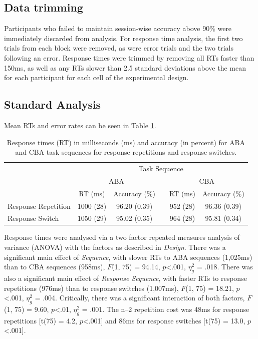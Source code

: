 \documentclass[a4paper, jou, natbib]{apa6}
\begin{document}
\subsection{Data trimming}
Participants who failed to maintain session-wise accuracy above 90\% were immediately discarded from analysis. For response time analysis, the first two trials from each block were removed, as were error trials and the two trials following an error. Response times were trimmed by removing all RTs faster than 150ms, as well as any RTs slower than 2.5 standard deviations above the mean for each participant for each cell of the experimental design. 

\subsection{Standard Analysis}
Mean RTs and error rates can be seen in Table \ref{tab:behaviouralData}.


\begin{table}[htbp]
\centering
\caption{Response times (RT) in milliseconds (ms) and accuracy (in percent) for ABA and CBA task sequences for response repetitions and response switches.}
\label{my-label}
\begin{tabular}{lccccc}
\hline
                    & \multicolumn{5}{c}{Task Sequence}                       \\ \cline{2-6} 
                    & \multicolumn{2}{c}{ABA}   &  & \multicolumn{2}{c}{CBA}  \\ \cline{2-3} \cline{5-6} 
                    & RT (ms)   & Accuracy (\%) &  & RT (ms)  & Accuracy (\%) \\ \hline
Response Repetition & 1000 (28) & 96.20 (0.39)  &  & 952 (28) & 96.36 (0.39) \\
Response Switch     & 1050 (29) & 95.02 (0.35)  &  & 964 (28) & 95.81 (0.34) \\ \hline
\end{tabular}
\label{tab:behaviouralData}
\end{table}

Response times were analysed via a two factor repeated measures analysis of variance (ANOVA) with the factors as described in \emph{Design}. There was a significant main effect of \emph{Sequence}, with slower RTs to ABA sequences (1,025ms) than to CBA sequences (958ms), $F$(1, 75) = 94.14, $p$<.001, $\eta_g^2$ = .018.  There was also a significant main effect of \emph{Response Sequence}, with faster RTs to response repetitions (976ms) than to response switches (1,007ms), $F$(1, 75) = 18.21, $p$<.001, $\eta_g^2$ = .004.  Critically, there was a significant interaction of both factors, $F$(1, 75) = 9.60, $p$<.01, $\eta_g^2$ = .001. The n--2 repetition cost was 48ms for response repetitions [t(75) = 4.2, $p$<.001] and 86ms for response switches [t(75) = 13.0, $p$<.001].
\end{document}
